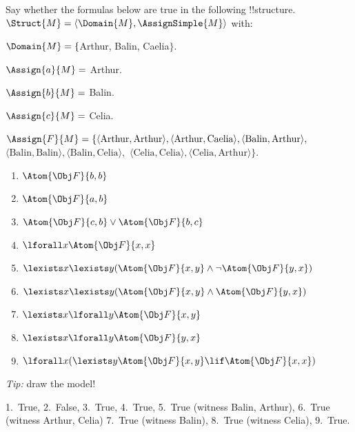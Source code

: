 \documentclass[../../../../include/open-logic-section]{subfiles}
\begin{document}


\begin{prob}
Say whether the formulas below are true
in the following !!{structure}.
$\Struct{M}=\langle\Domain{M},\AssignSimple{M}\rangle$ with:

$\Domain{M}=\{$Arthur, Balin, Caelia$\}$.

$\Assign{a}{M} =$ Arthur. 

$\Assign{b}{M} =$ Balin.

$\Assign{c}{M} =$ Celia.

$\Assign{\mathord{F}}{M} =\{\langle\mbox{Arthur},\mbox{Arthur}\rangle,\langle\mbox{Arthur},\mbox{Caelia}\rangle,\langle\mbox{Balin},\mbox{Arthur}\rangle,$
$\langle\mbox{Balin},\mbox{Balin}\rangle,\langle\mbox{Balin},\mbox{Celia}\rangle,$
$\langle\mbox{Celia},\mbox{Celia}\rangle,\langle\mbox{Celia},\mbox{Arthur}\rangle\}$.
\begin{enumerate}
\item $\Atom{\Obj F}{b,b}$
\item $\Atom{\Obj F}{a,b}$
\item $\Atom{\Obj F}{c,b}\lor \Atom{\Obj F}{b,c}$
\item $\lforall x\Atom{\Obj F}{x,x}$
\item $\lexists x\lexists y(\Atom{\Obj F}{x,y}\land\lnot \Atom{\Obj F}{y,x})$
\item $\lexists x\lexists y(\Atom{\Obj F}{x,y}\land \Atom{\Obj F}{y,x})$
\item $\lexists x\lforall y\Atom{\Obj F}{x,y}$
\item $\lexists x\lforall y\Atom{\Obj F}{y,x}$
\item $\lforall x(\lexists y\Atom{\Obj F}{x,y}\lif \Atom{\Obj F}{x,x})$
\end{enumerate}
\emph{Tip: }draw the model!
\begin{ans}
1.~True, 2.~False, 3.~True, 4.~True, 5.~True (witness Balin, Arthur), 
6.~True (witness Arthur, Celia) 7.~True (witness Balin), 
8.~True (witness Celia), 9.~True.
\end{ans}
\end{prob}
\end{document}
